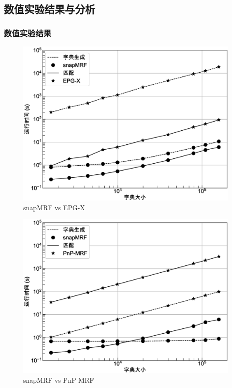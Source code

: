 \documentclass{beamer}
\begin{document}
\subsection{数值实验结果与分析}
\begin{frame}
	\frametitle{数值实验结果}
		\begin{figure}[htbp]
\begin{minipage}[t]{0.45\textwidth}
\centering
\includegraphics[width=1.1\textwidth]{../img/snapmrf/time_vs_epgx.eps}
\\ snapMRF vs EPG-X
\end{minipage}
\hspace{0.5cm}
\begin{minipage}[t]{0.45\textwidth}
\centering
\includegraphics[width=1.1\textwidth]{../img/snapmrf/time_vs_pnp.eps}
\\ snapMRF vs PnP-MRF
\end{minipage}
\end{figure}
\end{frame}
\end{document}
